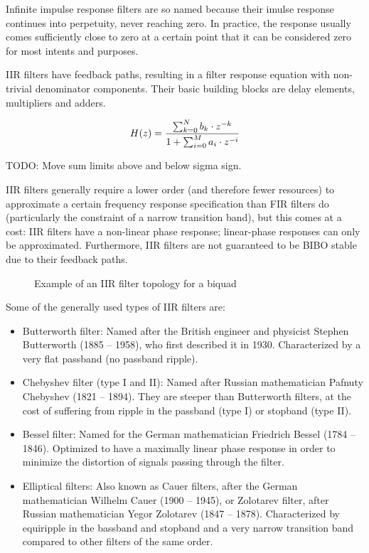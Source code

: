 Infinite impulse response  filters are so named because  their imulse response
continues  into perpetuity,  never  reaching zero. In  practice, the  response
usually comes  sufficiently close to  zero at a certain  point that it  can be
considered zero for most intents and purposes.

IIR filters have feedback paths, resulting  in a filter response equation with
non-trivial  denominator components. Their  basic  building  blocks are  delay
elements, multipliers and adders.

\begin{equation}
    \label{eq:iir_filter}
    H(z) = \frac{%
            \sum_{k=0}^N b_k \cdot z^{-k}}{%
            1 + \sum_{i=0}^M a_i \cdot z^{-i}}
\end{equation}

TODO: Move sum limits above and below sigma sign.

IIR filters generally require a lower order (and therefore fewer resources) to
approximate a  certain frequency  response specification  than FIR  filters do
(particularly the constraint of a narrow transition band), but this comes at a
cost:  IIR  filters have a  non-linear phase response;  linear-phase responses
can only  be approximated. Furthermore, IIR  filters are not guaranteed  to be
BIBO stable due to their feedback paths.

\begin{figure}
    \centering
    
    \caption[IIR Filter: Biquad]{Example of an IIR filter topology for a biquad}
    \label{fig:filtertopologies:iir}
\end{figure}

Some of the generally used types of IIR filters are:

\begin{itemize}\tightlist
    \item
        Butterworth  filter: Named after  the British  engineer and  physicist
        Stephen  Butterworth  (1885  --  1958),  who  first  described  it  in
        1930. Characterized by a very flat passband (no passband ripple).
    \item
        Chebyshev filter  (type I  and II): Named after  Russian mathematician
        Pafnuty Chebyshev  (1821 --  1894). They are steeper  than Butterworth
        filters, at the cost of suffering from ripple in the passband (type I)
        or stopband (type II).
    \item
        Bessel  filter: Named for  the German  mathematician Friedrich  Bessel
        (1784 -- 1846). Optimized to have a maximally linear phase response in
        order  to  minimize the  distortion  of  signals passing  through  the
        filter.
    \item
        Elliptical  filters: Also known  as  Cauer filters,  after the  German
        mathematician Wilhelm Cauer (1900 -- 1945), or Zolotarev filter, after
        Russian mathematician Yegor Zolotarev (1847 -- 1878). Characterized by
        equiripple in the  bassband and stopband and a  very narrow transition
        band compared to other filters of the same order.
\end{itemize}

